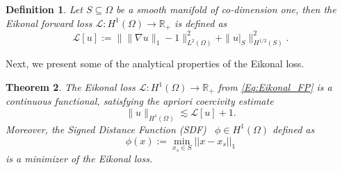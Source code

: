 \documentclass[pdflatex]{sn-jnl}%
\newtheorem{theorem}{Theorem}[section]%
\newtheorem{proposition}[theorem]{Proposition}%
\newtheorem{definition}[theorem]{Definition}
\begin{document}
\begin{definition}\label{Def:Eikonal_FP}
    Let $S\subseteq \Omega$ be a smooth manifold of co-dimension one, then the \emph{Eikonal forward loss} $\mathcal{L}:H^1(\Omega)\rightarrow\mathbb{R}_+$ is defined as
    \begin{equation}\label{Eq:Eikonal_FP}
        \mathcal{L}[u]:= \bigr\|\|\nabla u\|_1-1\bigr\|_{L^2(\Omega)}^2+\|u|_{S}\|_{H^{1/2}(S)}^2.
    \end{equation}
\end{definition}
Next, we present some of the analytical properties of the Eikonal loss. 
\begin{theorem}\label{thm:prop_eik_loss}
    The Eikonal loss $\mathcal{L}:H^1(\Omega)\rightarrow\mathbb{R}_+$ from \eqref{Eq:Eikonal_FP} is a continuous functional,
    satisfying the apriori coercivity estimate 
    \begin{equation}\label{eq:apr_est_eik}
        \|u\|_{H^1(\Omega)}\lesssim \mathcal{L}[u]+1.
    \end{equation}
    Moreover, the Signed Distance Function (SDF)~\cite{Alimov2019-np} $\phi\in H^1(\Omega)$ defined as
    \begin{equation}
        \phi(x):=\min\limits_{x_s\in S}||x-x_s||_1
    \end{equation}
    is a minimizer of the Eikonal loss. 
\end{theorem}
\end{document}
